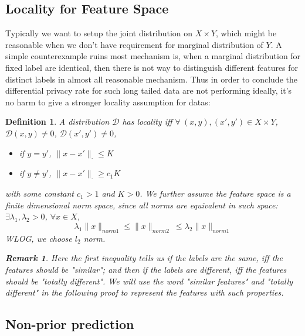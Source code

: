 \documentclass[12pt]{article}
\numberwithin{theorem}{section} %
\newtheorem{definition}{Definition}
\numberwithin{definition}{section} %
\numberwithin{assumption}{section} %
\numberwithin{lemma}{section} %
\newtheorem{remark}{Remark}
\numberwithin{remark}{section} %
\numberwithin{prop}{section} %
\numberwithin{corollary}{section} %
\numberwithin{example}{section} %
\numberwithin{question}{section} %
\numberwithin{problem}{section} %
\numberwithin{conjecture}{section} %
\numberwithin{append}{section} %
\numberwithin{property}{section} %
\def\D{{\mathcal{D}}}     %
\begin{document}
\subsection{Locality for Feature Space}
Typically we want to setup the joint distribution on $X\times Y$, which might be reasonable when we don't have requirement for marginal distribution of $Y$. A simple counterexample ruins most mechanism is, when a marginal distribution for fixed label are identical, then there is not way to distinguish different features for distinct labels in almost all reasonable mechanism. Thus in order to conclude the  differential privacy rate for such long tailed data are not performing ideally, it's no harm to give a stronger locality assumption for datas:

\begin{definition}
	A distribution $\D$ has locality iff $\forall\ (x,y),(x',y')\in X\times Y$, $\D(x,y)\neq 0$, $\D(x',y')\neq 0$, 
	\begin{itemize}
		\item if $y=y'$, $\lVert x-x'\rVert_\cdot\le K$\\
		\item if $y\neq y'$, $\lVert x-x'\rVert_\cdot\ge c_1K$
	\end{itemize}
with some constant $c_1>1$ and $K>0$. We further assume the feature space is a finite dimensional norm space, since all norms are equivalent in such space: $\exists \lambda_1,\lambda_2>0$, $\forall x\in X$, 
\begin{equation}
	\lambda_1\lVert x \rVert_{norm1}\le \lVert x \rVert_{norm2}\
	\le \lambda_2\lVert x \rVert_{norm1}
\end{equation}
WLOG, we choose $l_2$ norm.
\begin{remark}
	Here the first inequality tells us if the labels are the same, iff the features should be "similar"; and then if the labels are different, iff the features should be "totally different". We will use the word "similar features" and "totally different" in the following proof to represent the features with such properties.
\end{remark}

\end{definition}


\subsection{Non-prior prediction}
\end{document}
